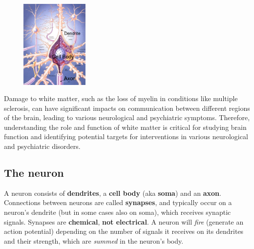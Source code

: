 \begin{figure}
  \centering
  \includegraphics[width=0.3\textwidth]{images/neuron.png}
\end{figure}
Damage to white matter, such as the loss of myelin in conditions like multiple sclerosis, can have significant impacts on communication between different regions of the brain, leading to various neurological and psychiatric symptoms. Therefore, understanding the role and function of white matter is critical for studying brain function and identifying potential targets for interventions in various neurological and psychiatric disorders.

\subsection{The neuron}
A neuron consists of \textbf{dendrites}, a \textbf{cell body} (aka \textbf{soma}) and an \textbf{axon}. Connections between neurons are called \textbf{synapses}, and typically occur on a neuron's dendrite (but in some cases also on soma), which receives synaptic signals. Synapses are \textbf{chemical}, \textbf{not electrical}.
A neuron will \textit{fire} (generate an action potential) depending on the number of signals it receives on its dendrites and their strength, which are \textit{summed} in the neuron's body. 


